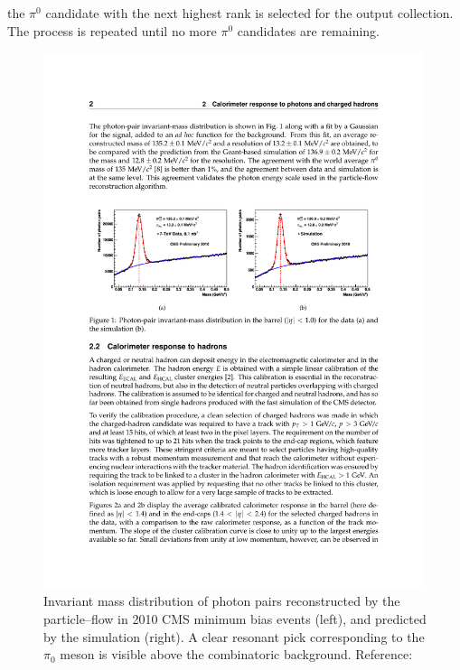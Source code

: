 the $\pi^0$ candidate with the next highest rank is selected for the output
collection.  The process is repeated until no more $\pi^0$ candidates are
remaining.
\begin{figure}[thbp]
  \centering
  \includegraphics[width=0.99\textwidth]{tanc_chapter/figures/PFPiZeroRes.pdf}
  \caption[Invariant mass distribution of PF photon pairs]{Invariant mass
  distribution of photon pairs reconstructed by the particle--flow in 2010 CMS
  minimum bias events (left), and predicted by the simulation (right).  A clear
  resonant pick corresponding to the $\pi_0$ meson is visible above the
  combinatoric background. Reference:~\cite{CMS-PAS-PFT-10-002}}
  \label{fig:PFPiZeroRes}
\end{figure}

